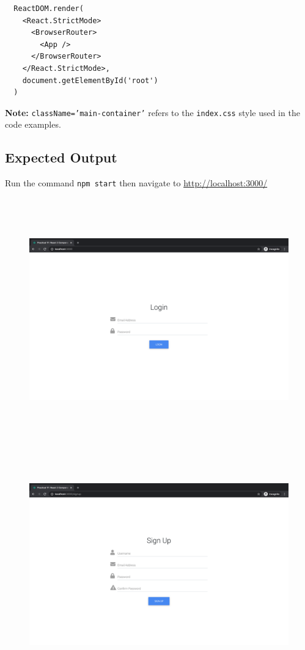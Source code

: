 \documentclass{article}
\begin{document}
\begin{verbatim}
  ReactDOM.render(
    <React.StrictMode>
      <BrowserRouter>
        <App />
      </BrowserRouter>
    </React.StrictMode>,
    document.getElementById('root')
  )
\end{verbatim}

\textbf{Note:} \texttt{className='main-container'} refers to the \texttt{index.css} style used in the code examples.

\subsection*{Expected Output} 
Run the command \texttt{npm start} then navigate to \href{http://localhost:3000/}{http://localhost:3000/} \\

\begin{figure}[H]
  \includegraphics[width=175mm, height=105mm]{./img/17-expected-form-1.png}
  \includegraphics[width=175mm, height=105mm]{./img/17-expected-form-2.png}
\end{figure}
\end{document}
